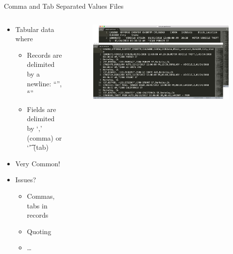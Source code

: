 \documentclass[aspectratio=169]{../latex_main/tntbeamer}  %
\begin{document}
    \begin{frame}{Comma and Tab Separated Values Files}
	   \begin{columns}
	   
	   
	   \begin{column}{.4\textwidth}
	    
	    \begin{itemize}
	        \item Tabular data where
	        \begin{itemize}
	            \item Records are delimited by a newline: “\n”, “\r\n”
	            \item Fields are delimited by ‘,’ (comma) or ‘\t’ (tab)
	        \end{itemize}
	        \item Very Common! 
	        \item Issues?
	        \begin{itemize}
	            \item Commas, tabs in records
	            \item Quoting
	            \item \dots
	        \end{itemize}
	    \end{itemize}
		\end{column}
		
	   \begin{column}{.4\textwidth}
	   \begin{figure}
	       		    \includegraphics[scale=.3]{Bild10}
	   \end{figure}

		\end{column}
		\end{columns}
	\end{frame}
	
\end{document}
